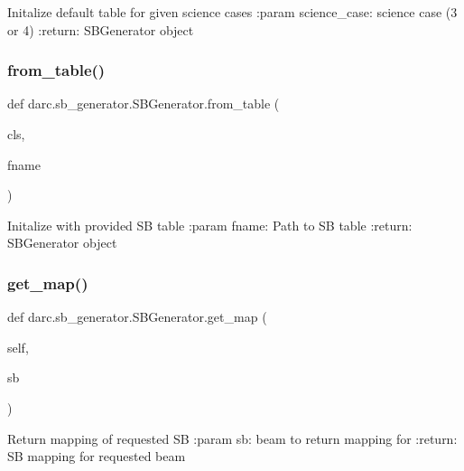 \begin{DoxyVerb}Initalize default table for given science cases
:param science_case: science case (3 or 4)
:return: SBGenerator object
\end{DoxyVerb}
 \mbox{\label{classdarc_1_1sb__generator_1_1_s_b_generator_a4b2a0826577d1e8b9543e3bdfee45d50}} 
\subsubsection{\texorpdfstring{from\_table()}{from\_table()}}
{\footnotesize\ttfamily def darc.\+sb\+\_\+generator.\+S\+B\+Generator.\+from\+\_\+table (\begin{DoxyParamCaption}\item[{}]{cls,  }\item[{}]{fname }\end{DoxyParamCaption})}

\begin{DoxyVerb}Initalize with provided SB table
:param fname: Path to SB table
:return: SBGenerator object
\end{DoxyVerb}
 \mbox{\label{classdarc_1_1sb__generator_1_1_s_b_generator_acf7a02329efc10c20717096c28e322ad}} 
\subsubsection{\texorpdfstring{get\_map()}{get\_map()}}
{\footnotesize\ttfamily def darc.\+sb\+\_\+generator.\+S\+B\+Generator.\+get\+\_\+map (\begin{DoxyParamCaption}\item[{}]{self,  }\item[{}]{sb }\end{DoxyParamCaption})}

\begin{DoxyVerb}Return mapping of requested SB
:param sb: beam to return mapping for
:return: SB mapping for requested beam
\end{DoxyVerb}
 \mbox{\label{classdarc_1_1sb__generator_1_1_s_b_generator_a295b024cfb66ca6a406e47d8e7b02022}} 
